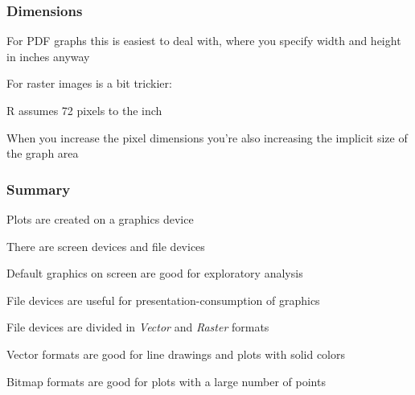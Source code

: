 \documentclass[12pt]{beamer}\usepackage[]{graphicx}\usepackage[]{color}
\begin{document}

\begin{frame}
\frametitle{Dimensions}

\bi
  \item For PDF graphs this is easiest to deal with, where you specify width 
  and height in inches anyway
  \item For raster images is a bit trickier:
  \item R assumes 72 pixels to the inch
  \item When you increase the pixel dimensions you're also increasing the 
  implicit size of the graph area
\ei
\eb

\end{frame}


\begin{frame}
\frametitle{Summary}

\bi
  \item Plots are created on a graphics device
  \item There are screen devices and file devices
  \item Default graphics on screen are good for exploratory analysis
  \item File devices are useful for presentation-consumption of graphics
  \item File devices are divided in \textit{Vector} and \textit{Raster} formats
  \item Vector formats are good for line drawings and plots with solid colors
  \item Bitmap formats are good for plots with a large number of points
\ei

\end{frame}

\end{document}
